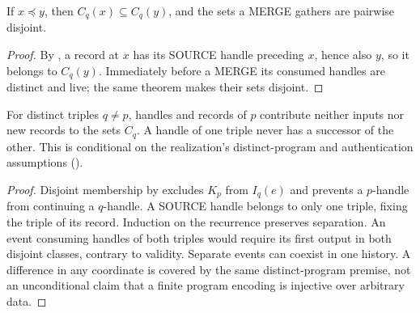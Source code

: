 \documentclass[../main.tex]{subfiles}
\begin{document}
\begin{theorem}
\label{thm:kpcfixed-invariants:set-membership-growth}
If $x\preceq y$, then $C_q(x)\subseteq C_q(y)$, and the sets a MERGE
gathers are pairwise disjoint.
\end{theorem}
\begin{proof}
By , a record at $x$ has its
SOURCE handle preceding $x$, hence also $y$, so it belongs to $C_q(y)$.
Immediately before a MERGE its consumed handles are distinct and live;
the same theorem makes their sets disjoint.
\end{proof}

\begin{theorem}
\label{thm:kpcfixed-invariants:key-isolation}
For distinct triples $q\ne p$, handles and records of $p$ contribute neither inputs
nor new records to the sets $C_q$. A handle of one triple never has a
successor of the other. This is conditional on the realization's
distinct-program and authentication assumptions
().
\end{theorem}
\begin{proof}
Disjoint membership by 
excludes $K_p$ from $I_q(e)$ and prevents a
$p$-handle from continuing a $q$-handle. A SOURCE handle belongs to
only one triple, fixing the triple of its record. Induction on the recurrence
preserves separation. An event consuming handles of both triples would
require its first output in both disjoint classes, contrary to validity.
Separate events can coexist in one history. A difference in any coordinate
is covered by the same distinct-program premise, not an unconditional
claim that a finite program encoding is injective over arbitrary data.
\end{proof}
\end{document}
